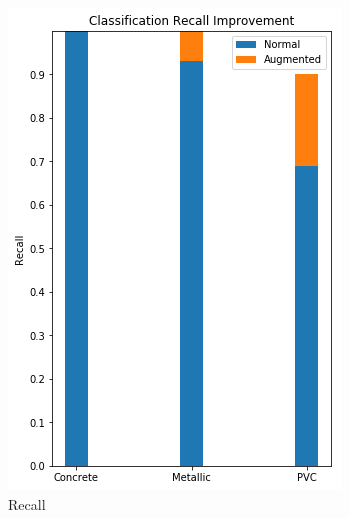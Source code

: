 \begin{figure}[H]
\begin{subfigure}[b]{0.4\linewidth}
    \includegraphics[width=\linewidth]{figures/Combined-Recall.png}
    \caption{Recall}
  \end{subfigure}
  \begin{subfigure}[b]{0.4\linewidth}

\end{subfigure}
\end{figure}
